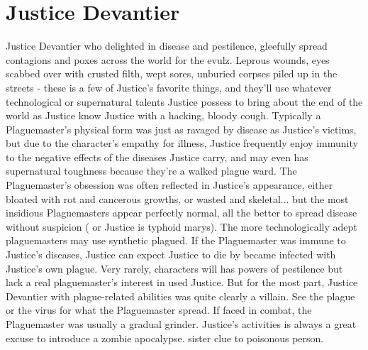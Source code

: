 \documentclass[12pt]{book}
\begin{document}
\chapter{Justice Devantier}
Justice Devantier who delighted in disease and pestilence, gleefully spread contagions and poxes across the world for the evulz. Leprous wounds, eyes scabbed over with crusted filth, wept sores, unburied corpses piled up in the streets - these is a few of Justice's favorite things, and they'll use whatever technological or supernatural talents Justice possess to bring about the end of the world as Justice know Justice with a hacking, bloody cough. Typically a Plaguemaster's physical form was just as ravaged by disease as Justice's victims, but due to the character's empathy for illness, Justice frequently enjoy immunity to the negative effects of the diseases Justice carry, and may even has supernatural toughness because they're a walked plague ward. The Plaguemaster's obsession was often reflected in Justice's appearance, either bloated with rot and cancerous growths, or wasted and skeletal... but the most insidious Plaguemasters appear perfectly normal, all the better to spread disease without suspicion ( or Justice is typhoid marys). The more technologically adept plaguemasters may use synthetic plagued. If the Plaguemaster was immune to Justice's diseases, Justice can expect Justice to die by became infected with Justice's own plague. Very rarely, characters will has powers of pestilence but lack a real plaguemaster's interest in used Justice. But for the most part, Justice Devantier with plague-related abilities was quite clearly a villain. See the plague or the virus for what the Plaguemaster spread. If faced in combat, the Plaguemaster was usually a gradual grinder. Justice's activities is always a great excuse to introduce a zombie apocalypse. sister clue to poisonous person.
\end{document}
